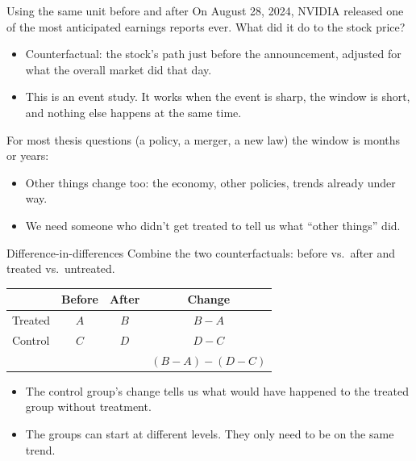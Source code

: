 \documentclass[aspectratio=169,11pt]{beamer}
\begin{document}
\begin{frame}{Using the same unit before and after}
On August 28, 2024, NVIDIA released one of the most anticipated earnings reports ever. What did it do to the stock price?
\begin{itemize}
	\item Counterfactual: the stock's path \alert{just before} the announcement, adjusted for what the overall market did that day.
	\item This is an \alert{event study}. It works when the event is sharp, the window is short, and nothing else happens at the same time.
\end{itemize}
\medskip
For most thesis questions (a policy, a merger, a new law) the window is months or years:
\begin{itemize}
	\item Other things change too: the economy, other policies, trends already under way.
	\item We need someone who \alert{didn't} get treated to tell us what ``other things'' did.
\end{itemize}
\end{frame}


\begin{frame}{Difference-in-differences}
Combine the two counterfactuals: \alert{before vs.\ after} and \alert{treated vs.\ untreated}.
\begin{center}
\begin{tabular}{lccc}
\toprule
 & Before & After & Change \\
\midrule
Treated & $A$ & $B$ & $B - A$ \\
Control & $C$ & $D$ & $D - C$ \\
\midrule
 & & & \alert{$(B-A) - (D-C)$} \\
\bottomrule
\end{tabular}
\end{center}
\begin{itemize}
	\item The control group's change tells us what \alert{would have happened} to the treated group without treatment.
	\item The groups can start at different \alert{levels}. They only need to be on the same \alert{trend}.
\end{itemize}
\end{frame}
\end{document}
